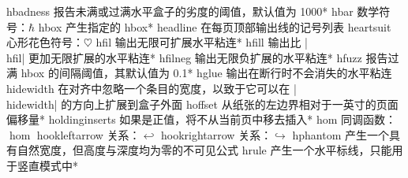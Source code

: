 \capcs hbadness {报告未满或过满水平盒子的劣度的阈值，默认值为 1000}*{}
\capcs hbar {数学符号：$\hbar$}{}{}
\capcs hbox {产生指定的 hbox}*{}
\capcs headline {在每页顶部输出线的记号列表}{}{}
\capcs heartsuit {心形花色符号：$\heartsuit$}{}{}
\capcs hfil {输出无限可扩展水平粘连}*{}
\capcs hfill {输出比 |\\hfil| 更加无限扩展的水平粘连}*{}
\capcs hfilneg {输出无限负扩展的水平粘连}*{}
\capcs hfuzz {报告过满 hbox 的间隔阈值，其默认值为 0.1\pt}*{}
\capcs hglue {输出在断行时不会消失的水平粘连}{}{}
\capcs hidewidth {在对齐中忽略一个条目的宽度，以致于它可以在 |\\hidewidth| 的方向上扩展到盒子外面}{}{}
\capcs hoffset {从纸张的左边界相对于一英寸的页面偏移量}*{}
\capcs holdinginserts {如果是正值，将不从当前页中移去插入}*{}
\capcs hom {同调函数：$\hom$}{}{}
\capcs hookleftarrow {关系：$\hookleftarrow$}{}{}
\capcs hookrightarrow {关系：$\hookrightarrow$}{}{}
\capcs hphantom {产生一个具有自然宽度，但高度与深度均为零的不可见公式}{}{}
\capcs hrule {产生一个水平标线，只能用于竖直模式中}*{}
